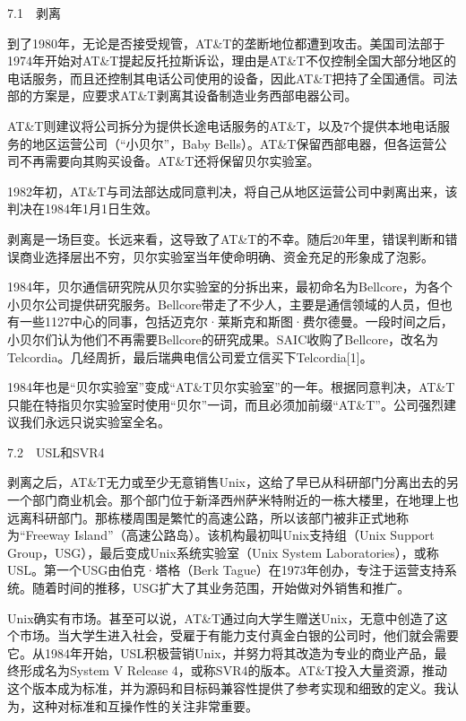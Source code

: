 \documentclass[a4paper,12pt,UTF8,twoside]{ctexbook}
\begin{document}
{{7.1　剥离


到了1980年，无论是否接受规管，AT\&T的垄断地位都遭到攻击。美国司法部于1974年开始对AT\&T提起反托拉斯诉讼，理由是AT\&T不仅控制全国大部分地区的电话服务，而且还控制其电话公司使用的设备，因此AT\&T把持了全国通信。司法部的方案是，应要求AT\&T剥离其设备制造业务西部电器公司。

AT\&T则建议将公司拆分为提供长途电话服务的AT\&T，以及7个提供本地电话服务的地区运营公司（“小贝尔”，Baby Bells）。AT\&T保留西部电器，但各运营公司不再需要向其购买设备。AT\&T还将保留贝尔实验室。

1982年初，AT\&T与司法部达成同意判决，将自己从地区运营公司中剥离出来，该判决在1984年1月1日生效。

剥离是一场巨变。长远来看，这导致了AT\&T的不幸。随后20年里，错误判断和错误商业选择层出不穷，贝尔实验室当年使命明确、资金充足的形象成了泡影。

1984年，贝尔通信研究院从贝尔实验室的分拆出来，最初命名为Bellcore，为各个小贝尔公司提供研究服务。Bellcore带走了不少人，主要是通信领域的人员，但也有一些1127中心的同事，包括迈克尔·莱斯克和斯图·费尔德曼。一段时间之后，小贝尔们认为他们不再需要Bellcore的研究成果。SAIC收购了Bellcore，改名为Telcordia。几经周折，最后瑞典电信公司爱立信买下Telcordia[1]。

1984年也是“贝尔实验室”变成“AT\&T贝尔实验室”的一年。根据同意判决，AT\&T只能在特指贝尔实验室时使用“贝尔”一词，而且必须加前缀“AT\&T”。公司强烈建议我们永远只说实验室全名。





7.2　USL和SVR4


剥离之后，AT\&T无力或至少无意销售Unix，这给了早已从科研部门分离出去的另一个部门商业机会。那个部门位于新泽西州萨米特附近的一栋大楼里，在地理上也远离科研部门。那栋楼周围是繁忙的高速公路，所以该部门被非正式地称为“Freeway Island”（高速公路岛）。该机构最初叫Unix支持组（Unix Support Group，USG），最后变成Unix系统实验室（Unix System Laboratories），或称USL。第一个USG由伯克·塔格（Berk Tague）在1973年创办，专注于运营支持系统。随着时间的推移，USG扩大了其业务范围，开始做对外销售和推广。

Unix确实有市场。甚至可以说，AT\&T通过向大学生赠送Unix，无意中创造了这个市场。当大学生进入社会，受雇于有能力支付真金白银的公司时，他们就会需要它。从1984年开始，USL积极营销Unix，并努力将其改造为专业的商业产品，最终形成名为System V Release 4，或称SVR4的版本。AT\&T投入大量资源，推动这个版本成为标准，并为源码和目标码兼容性提供了参考实现和细致的定义。我认为，这种对标准和互操作性的关注非常重要。

}}
\end{document}

